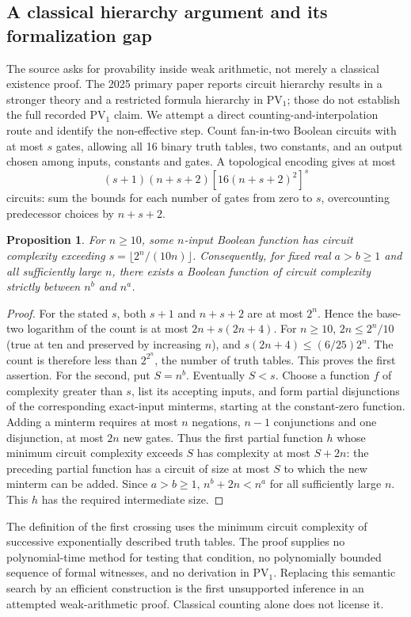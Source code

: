\documentclass[11pt]{article}
\newtheorem{proposition}{Proposition}
\begin{document}
\subsection{A classical hierarchy argument and its formalization gap}
The source asks for provability inside weak arithmetic, not merely a classical existence proof. The 2025 primary paper reports circuit hierarchy results in a stronger theory and a restricted formula hierarchy in $\mathrm{PV}_1$; those do not establish the full recorded $\mathrm{PV}_1$ claim. We attempt a direct counting-and-interpolation route and identify the non-effective step.
Count fan-in-two Boolean circuits with at most $s$ gates, allowing all 16 binary truth tables, two constants, and an output chosen among inputs, constants and gates. A topological encoding gives at most
\[
(s+1)(n+s+2)[16(n+s+2)^2]^s
\]
circuits: sum the bounds for each number of gates from zero to $s$, overcounting predecessor choices by $n+s+2$.
\begin{proposition}
For $n\ge10$, some $n$-input Boolean function has circuit complexity exceeding $s=\lfloor2^n/(10n)\rfloor$. Consequently, for fixed real $a>b\ge1$ and all sufficiently large $n$, there exists a Boolean function of circuit complexity strictly between $n^b$ and $n^a$.
\end{proposition}
\begin{proof}
For the stated $s$, both $s+1$ and $n+s+2$ are at most $2^n$. Hence the base-two logarithm of the count is at most $2n+s(2n+4)$. For $n\ge10$, $2n\le2^n/10$ (true at ten and preserved by increasing $n$), and $s(2n+4)\le(6/25)2^n$. The count is therefore less than $2^{2^n}$, the number of truth tables. This proves the first assertion.
For the second, put $S=n^b$. Eventually $S<s$. Choose a function $f$ of complexity greater than $s$, list its accepting inputs, and form partial disjunctions of the corresponding exact-input minterms, starting at the constant-zero function. Adding a minterm requires at most $n$ negations, $n-1$ conjunctions and one disjunction, at most $2n$ new gates. Thus the first partial function $h$ whose minimum circuit complexity exceeds $S$ has complexity at most $S+2n$: the preceding partial function has a circuit of size at most $S$ to which the new minterm can be added. Since $a>b\ge1$, $n^b+2n<n^a$ for all sufficiently large $n$. This $h$ has the required intermediate size.
\end{proof}
The definition of the first crossing uses the minimum circuit complexity of successive exponentially described truth tables. The proof supplies no polynomial-time method for testing that condition, no polynomially bounded sequence of formal witnesses, and no derivation in $\mathrm{PV}_1$. Replacing this semantic search by an efficient construction is the first unsupported inference in an attempted weak-arithmetic proof. Classical counting alone does not license it.
\end{document}

